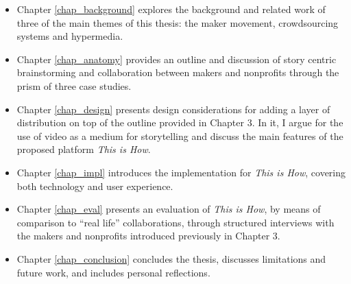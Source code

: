 \begin{itemize}

\item Chapter \ref{chap_background} explores the background and related work of three of the main themes of this thesis: the maker movement, crowdsourcing systems and hypermedia.

\item Chapter \ref{chap_anatomy} provides an outline and discussion of story centric brainstorming and collaboration between makers and nonprofits through the prism of three case studies. 

\item Chapter \ref{chap_design} presents design considerations for adding a layer of distribution on top of the outline provided in Chapter 3. In it, I argue for the use of video as a medium for storytelling and discuss the main features of the proposed platform \textit{This is How}.

\item Chapter \ref{chap_impl} introduces the implementation for \textit{This is How}, covering both technology and user experience.  

\item Chapter \ref{chap_eval} presents an evaluation of \textit{This is How}, by means of comparison to ``real life'' collaborations, through structured interviews with the makers and nonprofits introduced previously in Chapter 3.

\item Chapter \ref{chap_conclusion} concludes the thesis, discusses limitations and future work, and includes personal reflections.      

\end{itemize}
